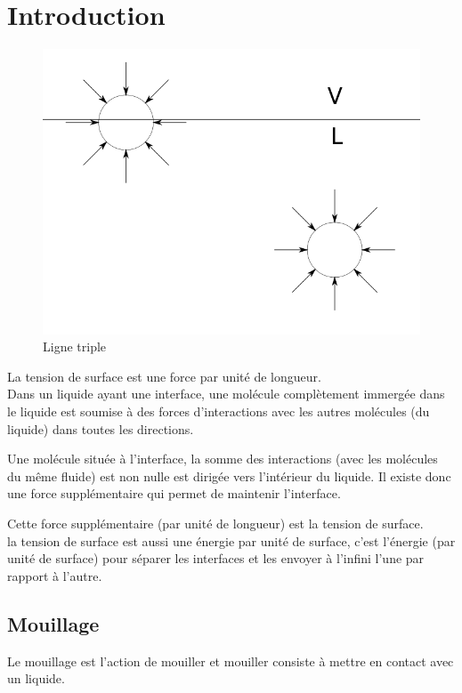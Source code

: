 \documentclass[french]{article}
\begin{document}
\section{Introduction}
\begin{figure}[ht]
	\centering
	\includegraphics[scale = 0.3]{./image/rondforces.png}
	\caption{Ligne triple}
\end{figure}

La tension de surface est une force par unité de longueur.\\ 

Dans un liquide ayant une interface, une molécule complètement immergée dans le liquide est soumise à des forces d'interactions avec les autres molécules (du liquide) dans toutes les directions. 

Une molécule située à l'interface, la somme des interactions (avec les molécules du même fluide) est non nulle est dirigée vers l'intérieur du liquide. Il existe donc une force supplémentaire qui permet de maintenir l'interface.

Cette force supplémentaire (par unité de longueur) est la tension de surface.\\



la tension de surface est aussi une énergie par unité de surface, c'est l'énergie (par unité de surface) pour séparer les interfaces et les envoyer à l'infini l'une par rapport à l'autre.


\subsection{Mouillage}
Le mouillage est l'action de mouiller et mouiller consiste à  mettre en contact avec un liquide.\\
\end{document}

